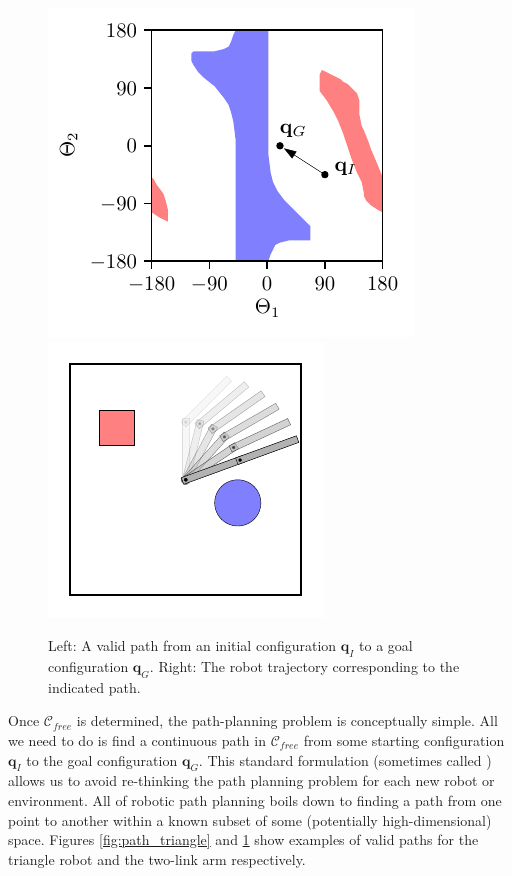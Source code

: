 \begin{figure}
  \begin{center}

      \includegraphics[valign=t]{planning/figs/arm_cspace/arm_c_space_motion.pdf}
      \includegraphics[valign=t]{planning/figs/arm_cspace/arm_world_motion.pdf}

\end{center}
\caption{Left: A valid path from an initial configuration
  $\mathbf{q}_{I}$ to a goal configuration $\mathbf{q}_{G}$. Right:
  The robot trajectory corresponding to the indicated path. }
\label{fig:path_arm}
\end{figure}



Once $\mathcal{C}_{free}$ is determined, the path-planning problem is
conceptually simple.  All we need to do is find a continuous path in
$\mathcal{C}_{free}$ from some starting configuration $\mathbf{q}_{I}$
to the goal configuration $\mathbf{q}_{G}$.  This standard formulation
(sometimes called ) allows us to avoid
re-thinking the path planning problem for each new robot or
environment.  All of robotic path planning boils down to finding a
path from one point to another within a known subset of some
(potentially high-dimensional) space.  Figures \ref{fig:path_triangle}
and \ref{fig:path_arm} show examples of valid paths for the triangle
robot and the two-link arm respectively.


